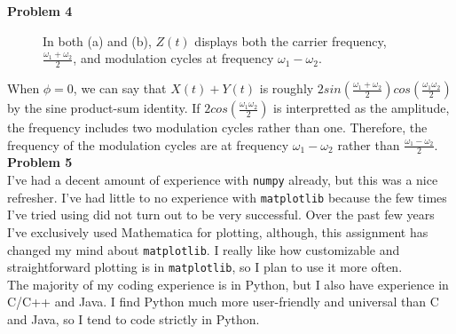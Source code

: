 \documentclass[12pt]{article}
\begin{document}
	\newpage	
		
	\noindent\textbf{\large Problem 4}
	\begin{figure}[ht]
		\caption{In both (a) and (b), $Z(t)$ displays both the carrier frequency, $\frac{\omega_1 + \omega_2}{2}$, and modulation cycles at frequency $\omega_1 - \omega_2$.}\label{fig:4}
	\end{figure}
	
	When $\phi = 0$, we can say that $X(t) + Y(t)$ is roughly $2sin(\frac{\omega_1+\omega_2}{2})cos(\frac{\omega_1\omega_2}{2})$ by the sine product-sum identity. If $2cos(\frac{\omega_1\omega_2}{2})$ is interpretted as the amplitude, the frequency includes two modulation cycles rather than one. Therefore, the frequency of the modulation cycles are at frequency $\omega_1 - \omega_2$ rather than $\frac{\omega_1 - \omega_2}{2}$. \\[4mm]
		
	\noindent\textbf{\large Problem 5}\\[2mm]
	I've had a decent amount of experience with \verb|numpy| already, but this was a nice refresher. I've had little to no experience with \verb|matplotlib| because the few times I've tried using did not turn out to be very successful. Over the past few years I've exclusively used Mathematica for plotting, although, this assignment has changed my mind about \verb|matplotlib|. I really like how customizable and straightforward plotting is in \verb|matplotlib|, so I plan to use it more often.\\
	The majority of my coding experience is in Python, but I also have experience in C/C++ and Java. I find Python much more user-friendly and universal than C and Java, so I tend to code strictly in Python. 
		
\end{document}
